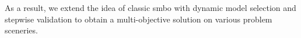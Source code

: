         As a result, we extend the idea of classic \gls{smbo} with dynamic model selection and stepwise validation to obtain a multi-objective solution on various problem sceneries. 
        

























    






